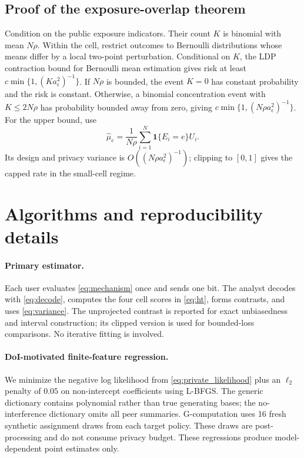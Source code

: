\documentclass[10pt]{article}
\theoremstyle{definition}
\theoremstyle{remark}
\newcommand{\ind}{\mathbf{1}}
\newcommand{\doisig}{a_{\epsilon}}
\begin{document}
\subsection{Proof of the exposure-overlap theorem}

Condition on the public exposure indicators. Their count $K$ is binomial with mean $N\rho$.
Within the cell, restrict outcomes to Bernoulli distributions whose means differ by a local
two-point perturbation. Conditional on $K$, the LDP contraction bound for Bernoulli mean
estimation gives risk at least $c\min\{1,(K\doisig^2)^{-1}\}$. If $N\rho$ is bounded, the event
$K=0$ has constant probability and the risk is constant. Otherwise, a binomial concentration
event with $K\le2N\rho$ has probability bounded away from zero, giving
$c\min\{1,(N\rho\doisig^2)^{-1}\}$. For the upper bound, use
\[
  \widehat\mu_e=\frac1{N\rho}\sum_{i=1}^N
  \ind\{E_i=e\}U_i.
\]
Its design and privacy variance is $O((N\rho\doisig^2)^{-1})$; clipping to $[0,1]$ gives the
capped rate in the small-cell regime.

\section{Algorithms and reproducibility details}

\paragraph{Primary estimator.}
Each user evaluates \eqref{eq:mechanism} once and sends one bit. The analyst decodes with
\eqref{eq:decode}, computes the four cell scores in \eqref{eq:ht}, forms contrasts, and uses
\eqref{eq:variance}. The unprojected contrast is reported for exact unbiasedness and interval
construction; its clipped version is used for bounded-loss comparisons. No iterative fitting
is involved.

\paragraph{DoI-motivated finite-feature regression.}
We minimize the negative log likelihood from \eqref{eq:private_likelihood} plus an $\ell_2$
penalty of $0.05$ on non-intercept coefficients using L-BFGS. The generic dictionary contains
polynomial rather than true generating bases; the no-interference dictionary omits all peer
summaries. G-computation uses 16 fresh synthetic assignment draws from each target policy.
These draws are post-processing and do not consume privacy budget. These regressions produce
model-dependent point estimates only.
\end{document}
